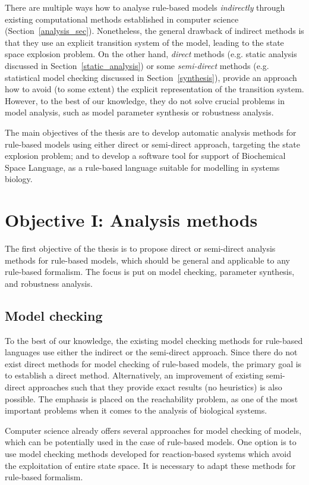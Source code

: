 \documentclass[11pt,a4paper]{report}
\begin{document}
There are multiple ways how to analyse rule-based models \emph{indirectly} through existing computational methods established in computer science (Section~\ref{analysis_sec}). Nonetheless, the general drawback of indirect methods is that they use an explicit transition system of the model, leading to the state space explosion problem. On the other hand, \emph{direct} methods (e.g. static analysis discussed in Section~\ref{static_analysis}) or some \emph{semi-direct} methods (e.g. statistical model checking discussed in Section~\ref{synthesis}), provide an approach how to avoid (to some extent) the explicit representation of the transition system. However, to the best of our knowledge, they do not solve crucial problems in model analysis, such as model parameter synthesis or robustness analysis.

The main objectives of the thesis are to develop automatic analysis methods for rule-based models using either direct or semi-direct approach, targeting the state explosion problem; and to develop a software tool for support of Biochemical Space Language, as a rule-based language suitable for modelling in systems biology.

\section{Objective I: Analysis methods}

The first objective of the thesis is to propose direct or semi-direct analysis methods for rule-based models, which should be general and applicable to any rule-based formalism. The focus is put on model checking, parameter synthesis, and robustness analysis.

\subsection{Model checking}

To the best of our knowledge, the existing model checking methods for rule-based languages use either the indirect or the semi-direct approach. Since there do not exist direct methods for model checking of rule-based models, the primary goal is to establish a direct method. Alternatively, an improvement of existing semi-direct approaches such that they provide exact results (no heuristics) is also possible. The emphasis is placed on the reachability problem, as one of the most important problems when it comes to the analysis of biological systems.

Computer science already offers several approaches for model checking of models, which can be potentially used in the case of rule-based models. One option is to use model checking methods developed for reaction-based systems which avoid the exploitation of entire state space. It is necessary to adapt these methods for rule-based formalism.
\end{document}
